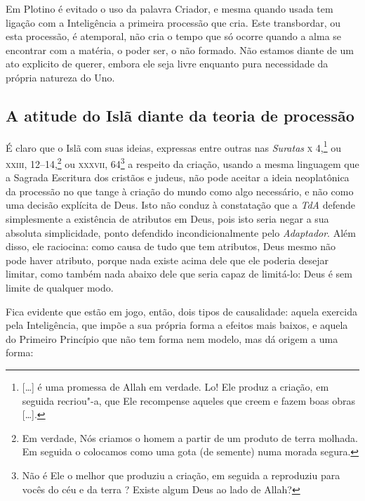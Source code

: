 Em Plotino é evitado o uso da palavra Criador, e mesma quando
usada tem ligação com a Inteligência a primeira processão que
cria.  Este transbordar, ou esta processão, é atemporal, não
cria o tempo que só ocorre quando a alma se encontrar com a
matéria, o poder ser, o não formado. Não estamos diante de um
ato explicito de querer, embora ele seja livre enquanto pura
necessidade da própria natureza do Uno.

\subsection{A atitude do Islã diante da teoria de processão}

É claro que o Islã com suas ideias, expressas entre outras nas
\emph{Suratas} \textsc{x} 4,\footnote{ [\ldots{}] é uma promessa de Allah em
verdade. Lo! Ele produz a criação, em seguida recriou"-a, que Ele
recompense aqueles que creem e fazem boas obras [\ldots{}].} ou
\textsc{xxiii}, 12--14,\footnote{ Em verdade, Nós criamos o homem a partir
de um produto de terra molhada. Em seguida o colocamos como uma
gota (de semente) numa morada segura.} ou \textsc{xxxvii},
64\footnote{ Não é Ele o melhor que produziu a criação, em
seguida a reproduziu para vocês do céu e da terra ? Existe algum
Deus ao lado de Allah?}  a respeito da criação, usando a mesma
linguagem que a Sagrada Escritura dos cristãos e judeus, não
pode aceitar a ideia neoplatônica da processão  no que tange à
criação do mundo como algo necessário, e não como uma decisão
explícita de Deus. Isto não conduz à constatação que a
\emph{TdA} defende simplesmente a existência de atributos em
Deus, pois isto seria negar a sua absoluta simplicidade, ponto
defendido incondicionalmente pelo \emph{Adaptador}. Além
disso, ele raciocina: como causa de tudo que tem atributos, Deus
mesmo não pode haver atributo, porque nada existe acima dele que
ele poderia desejar limitar, como também nada abaixo dele que
seria capaz de limitá-lo: Deus é sem limite de qualquer modo. 

Fica evidente que estão em jogo, então, dois tipos de
causalidade: aquela exercida pela Inteligência, que impõe a sua
própria forma a efeitos mais baixos, e aquela do Primeiro
Princípio que não tem forma nem modelo, mas dá origem a uma
forma:

